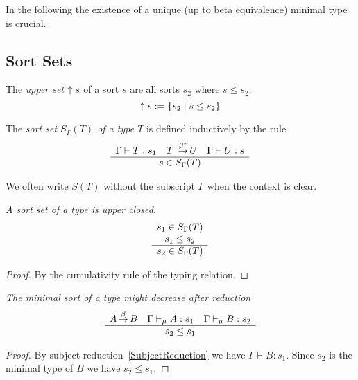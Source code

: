 In the following the existence of a unique (up to beta equivalence) minimal type
is crucial.





\subsection{Sort Sets}


\begin{definition}
    \label{def:UpperSet}
    The \emph{upper set} ${\uparrow s}$ of a sort $s$ are all sorts
    $s_2$ where $s \le s_2$.
    $$
    {\uparrow s} := {\left\{s_2 \mid s \le s_2\right\}}
    $$
\end{definition}




\begin{definition}
    \label{def:SortSet}
    The \emph{sort set $S_\Gamma(T)$ of a type $T$} is defined inductively by
    the rule
    $$
    \ruleh{
        \Gamma \vdash T : s_1\quad
        T \reducestar U\quad
        \Gamma \vdash U : s
    }
    {
        s \in S_\Gamma(T)
    }
    $$

    We often write $S(T)$ without the subscript $\Gamma$ when the context is
    clear.
\end{definition}





\begin{theorem}
    \label{thm:SortSetUpperClosed}
    \emph{A sort set of a type is upper closed}.
    $$
        \begin{array}{c} 
            s_1 \in S_\Gamma(T)
            \\
            s_1 \le s_2
         \\ \hline 
            s_2 \in S_\Gamma(T)
        \end{array}
    $$
    \begin{proof}
        By the cumulativity rule of the typing relation.
    \end{proof}
\end{theorem}


\begin{theorem}
    \label{thm:MinimalSortDecreases}
    \emph{The minimal sort of a type might decrease after reduction}
    $$
    \begin{array}{c} 
        A {\,\stackrel{\beta}{\to}\,} B
        \quad \Gamma \vdash_\mu A: s_1
        \quad \Gamma \vdash_\mu B: s_2
     \\ \hline 
        s_2 \le s_1
    \end{array}
    $$

    \begin{proof}
        By subject reduction~\ref{SubjectReduction} we have $\Gamma \vdash B:
        s_1$. Since $s_2$ is the minimal type of $B$ we have $s_2 \le s_1$.
    \end{proof}

\end{theorem}




